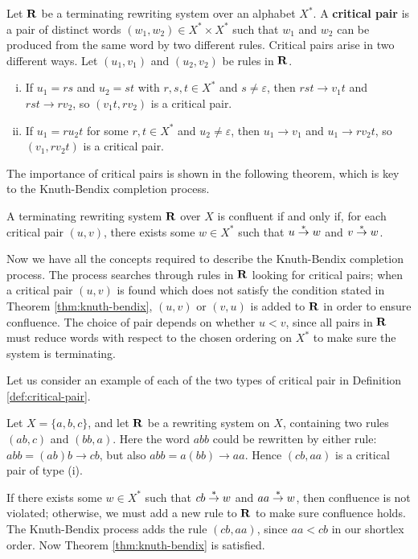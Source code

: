 \begin{definition}
  \label{def:critical-pair}
  Let $\mathbf{R}$ be a terminating rewriting system over an alphabet $X^*$.  A
  \textbf{critical pair} is a pair of distinct words
  $(w_1, w_2) \in X^* \times X^*$ such that $w_1$ and $w_2$ can be produced from
  the same word by two different rules.
  Critical pairs arise in two different ways.
  Let $(u_1, v_1)$ and $(u_2, v_2)$ be rules in $\mathbf{R}$.
  \begin{enumerate}[(i)]
  \item If $u_1 = rs$ and $u_2 = st$ with $r,s,t \in X^*$ and
    $s \neq \varepsilon$, then $rst \to v_1t$ and $rst \to rv_2$, so
    $(v_1t, rv_2)$ is a critical pair.
  \item If $u_1 = ru_2t$ for some $r,t \in X^*$ and $u_2 \neq \varepsilon$, then
    $u_1 \to v_1$ and $u_1 \to rv_2t$, so $(v_1, rv_2t)$ is a critical
    pair.
  \end{enumerate}
\end{definition}

The importance of critical pairs is shown in the following theorem, which is key
to the Knuth-Bendix completion process.

\begin{theorem}
  \label{thm:knuth-bendix}
  A terminating rewriting system $\mathbf{R}$ over $X$ is confluent if and only if,
  for each critical pair $(u, v)$, there exists some $w \in X^*$ such that
  $u \stackrel{*}{\to} w$ and $v \stackrel{*}{\to} w$.
\end{theorem}

Now we have all the concepts required to describe the Knuth-Bendix completion
process.  The process searches through rules in $\mathbf{R}$ looking for critical
pairs; when a critical pair $(u, v)$ is found which does not satisfy the
condition stated in Theorem \ref{thm:knuth-bendix}, $(u, v)$ or $(v, u)$ is
added to $\mathbf{R}$ in order to ensure confluence.  The choice of pair depends on
whether $u < v$, since all pairs in $\mathbf{R}$ must reduce words with respect to the
chosen ordering on $X^*$ to make sure the system is terminating.

Let us consider an example of each of the two types of critical pair in
Definition \ref{def:critical-pair}.

\begin{example}
  Let $X=\{a,b,c\}$, and let $\mathbf{R}$ be a rewriting system on $X$, containing
  two rules $(ab, c)$ and $(bb, a)$.  Here the word $abb$ could be
  rewritten by either rule: $abb = (ab)b \to cb$, but also
  $abb = a(bb) \to aa$.  Hence $(cb, aa)$ is a critical pair of type (i).

  If there exists some $w \in X^*$ such that $cb \stackrel{*}{\to} w$ and $aa \stackrel{*}{\to} w$,
  then confluence is not violated; otherwise, we must add a new rule to $\mathbf{R}$
  to make sure confluence holds.  The Knuth-Bendix process adds the rule
  $(cb, aa)$, since $aa < cb$ in our shortlex order.  Now Theorem
  \ref{thm:knuth-bendix} is satisfied.
\end{example}

